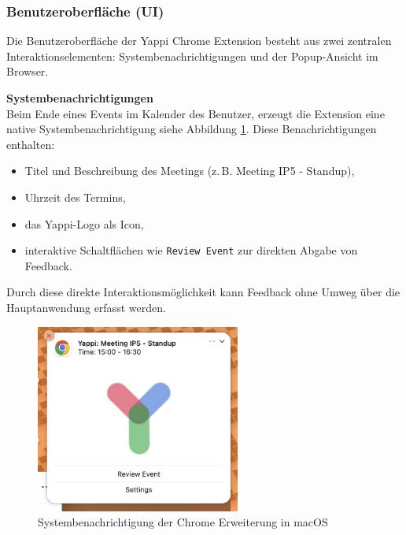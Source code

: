 \documentclass[12pt,a4paper]{report}
\begin{document}
    \subsubsection{Benutzeroberfläche (UI)}
        Die Benutzeroberfläche der Yappi Chrome Extension besteht aus zwei zentralen Interaktionselementen: Systembenachrichtigungen und der Popup-Ansicht im Browser.

        \textbf{Systembenachrichtigungen} \\
            Beim Ende eines Events im Kalender des Benutzer, erzeugt die Extension eine native Systembenachrichtigung siehe Abbildung \ref{fig:yappi-extension-notification}.
            Diese Benachrichtigungen enthalten:
            \begin{itemize}
                \item Titel und Beschreibung des Meetings (z.\,B. \glqq Meeting IP5 - Standup\grqq),
                \item Uhrzeit des Termins,
                \item das Yappi-Logo als Icon,
                \item interaktive Schaltflächen wie \texttt{Review Event} zur direkten Abgabe von Feedback.
            \end{itemize}
            Durch diese direkte Interaktionsmöglichkeit kann Feedback ohne Umweg über die Hauptanwendung erfasst werden.

            \begin{figure}[htbp]
              \centering
              \includegraphics[width=0.60\textwidth]{../figures/yappi-chrome-extension/yappi-extension-notification.jpg}
              \caption{Systembenachrichtigung der Chrome Erweiterung in macOS}
              \label{fig:yappi-extension-notification}
            \end{figure}
\end{document}
